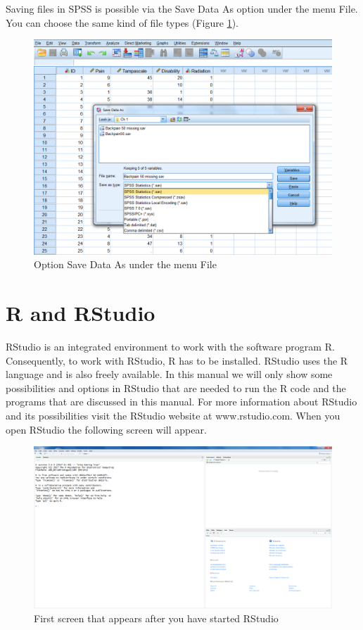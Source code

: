 \documentclass[]{book}
\theoremstyle{definition}
\theoremstyle{definition}
\theoremstyle{definition}
\theoremstyle{remark}
\begin{document}
Saving files in SPSS is possible via the Save Data As option under the
menu File. You can choose the same kind of file types (Figure
\ref{fig:fig9}).

\begin{figure}

{\centering \includegraphics[width=0.9\linewidth]{images/fig1.9} 

}

\caption{Option Save Data As under the menu File}\label{fig:fig9}
\end{figure}

\section{R and RStudio}\label{r-and-rstudio}

RStudio is an integrated environment to work with the software program
R. Consequently, to work with RStudio, R has to be installed. RStudio
uses the R language and is also freely available. In this manual we will
only show some possibilities and options in RStudio that are needed to
run the R code and the programs that are discussed in this manual. For
more information about RStudio and its possibilities visit the RStudio
website at www.rstudio.com. When you open RStudio the following screen
will appear.

\begin{figure}

{\centering \includegraphics[width=0.9\linewidth]{images/fig1.10} 

}

\caption{First screen that appears after you have started RStudio}\label{fig:fig10}
\end{figure}
\end{document}
